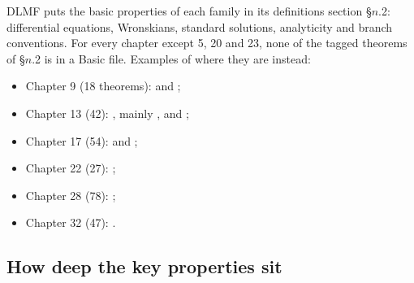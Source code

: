 \documentclass[11pt,a4paper]{article}
\begin{document}
DLMF puts the basic properties of each family in its definitions section §\(n\).2: differential
equations, Wronskians, standard solutions, analyticity and branch conventions. For every chapter
except 5, 20 and 23, none of the tagged theorems of §\(n\).2 is in a Basic file. Examples of
where they are instead:
\begin{itemize}
  \item Chapter 9 (18 theorems):  and ;
  \item Chapter 13 (42): , mainly
    ,  and
    ;
  \item Chapter 17 (54):  and
    ;
  \item Chapter 22 (27): ;
  \item Chapter 28 (78): ;
  \item Chapter 32 (47): .
\end{itemize}

\subsection{How deep the key properties sit}
\end{document}
